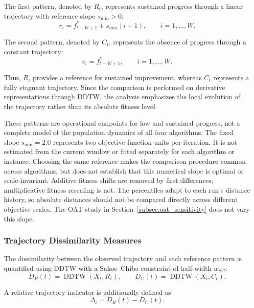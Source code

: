 \documentclass[mathematics,article,accept,moreauthors]{Definitions/mdpi}
\begin{document}
The first pattern, denoted by $R_t$, represents sustained progress through
a linear trajectory with reference slope $s_{\min}>0$:
\begin{equation}
r_i =
f_{t-W+1}^*
+
s_{\min}(i-1),
\qquad i=1,\ldots,W.
\label{eq:ramp_pattern}
\end{equation}

The second pattern, denoted by $C_t$, represents the absence of progress
through a constant trajectory:
\begin{equation}
c_i =
f_{t-W+1}^*,
\qquad i=1,\ldots,W.
\label{eq:constant_pattern}
\end{equation}

Thus, $R_t$ provides a reference for sustained improvement, whereas $C_t$
represents a fully stagnant trajectory. Since the comparison is performed
on derivative representations through DDTW, the analysis emphasizes the
local evolution of the trajectory rather than its absolute fitness level.

These patterns are operational endpoints for low and sustained progress,
not a complete model of the population dynamics of all four algorithms.
The fixed slope $s_{\min}=2.0$ represents two objective-function units per
iteration. It is not estimated from the current window or fitted separately
for each algorithm or instance. Choosing the same reference makes the
comparison procedure common across algorithms, but does not establish that
this numerical slope is optimal or scale-invariant. Additive fitness shifts
are removed by first differences; multiplicative fitness rescaling is not.
The percentiles adapt to each run's distance history, so absolute distances
should not be compared directly across different objective scales. The OAT
study in Section~\ref{subsec:oat_sensitivity} does not vary this slope.


\subsubsection{Trajectory Dissimilarity Measures}

The dissimilarity between the observed trajectory and each reference pattern
is quantified using DDTW with a Sakoe--Chiba constraint of half-width
$w_{\mathrm{SC}}$:
\begin{equation}
D_R(t)
=
\operatorname{DDTW}(X_t,R_t),
\qquad
D_C(t)
=
\operatorname{DDTW}(X_t,C_t).
\label{eq:ddtw_distances}
\end{equation}

A relative trajectory indicator is additionally defined as
\begin{equation}
\Delta_t = D_R(t)-D_C(t).
\label{eq:trajectory_delta}
\end{equation}
\end{document}
